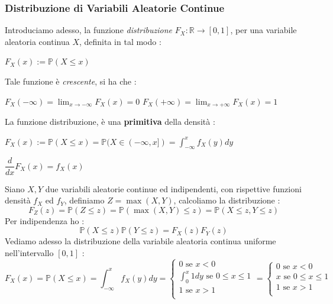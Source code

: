 \documentclass[12pt, letterpaper]{article}
\newcommand{\R}{{\mathbb R}}
\newcommand{\Prob}{{\mathbb P}}
\begin{document}
\subsubsection{Distribuzione di Variabili Aleatorie Continue}
Introduciamo adesso, la funzione \textit{distribuzione} \(F_X:\R\rightarrow[0,1]\), per una variabile aleatoria  continua \(X\), 
definita in tal modo : \begin{center}
    \(F_X(x):=\Prob(X\le x)\)
\end{center}
Tale funzione è \textit{crescente}, si ha che :\begin{center}
    \(F_X(-\infty)=\displaystyle\lim_{x\rightarrow -\infty}F_X(x)=0\)\hphantom{text}
    \(F_X(+\infty)=\displaystyle\lim_{x\rightarrow +\infty}F_X(x)=1\)
\end{center}
La funzione distribuzione, è una \textbf{primitiva} della densità :\begin{center}
    \(F_X(x):=\Prob(X\le x)=\Prob(X\in(-\infty,x])=\displaystyle\int_{-\infty}^x f_X(y)dy\)
\end{center}\begin{center}
    \(\dfrac{d}{dx}F_X(x)=f_X(x)\)
\end{center}
Siano \(X,Y\) due variabili aleatorie continue ed indipendenti, con rispettive 
funzioni densità \(f_X\) ed \(f_Y\), definiamo \(Z=\max(X,Y)\), calcoliamo la distribuzione :
\begin{equation}
    F_Z(z)=\Prob(Z\le z)=\Prob(\max(X,Y)\le z)=\Prob(X\le z, Y\le z) 
\end{equation} Per indipendenza ho :\begin{equation}
    \Prob(X\le z)\Prob( Y\le z) =F_X(z)F_Y(z)
\end{equation}
Vediamo adesso la distribuzione della variabile aleatoria continua uniforme nell’intervallo \([0, 1]\) :\begin{equation}
    F_X(x)=\Prob(X\le x)=\int_{-\infty}^x f_X(y)dy=\begin{cases}
        0\text{ se }x<0\\
        \int_0^x 1dy\text{ se }0\le x\le 1\\
        1\text{ se }x>1\\
    \end{cases}=\begin{cases}
        0\text{ se }x<0\\
        x\text{ se }0\le x\le 1\\
        1\text{ se }x>1\\
    \end{cases}
\end{equation}
\begin{figure}[h]
\end{figure}
\end{document}
